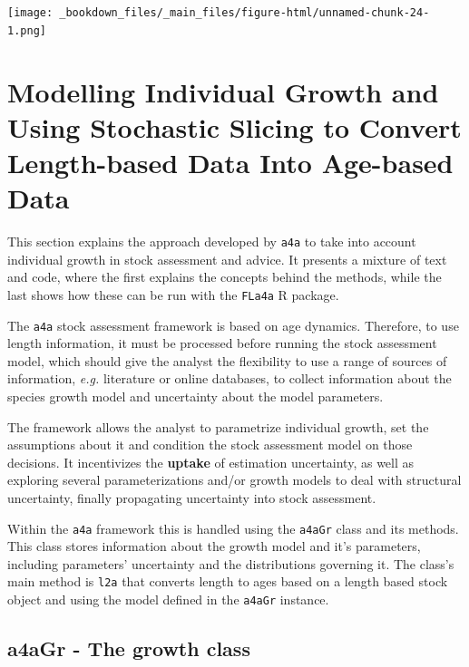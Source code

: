 \documentclass[
]{book}
\begin{document}
\texttt{[image: \_bookdown\_files/\_main\_files/figure-html/unnamed-chunk-24-1.png]}

\hypertarget{modelling-individual-growth-and-using-stochastic-slicing-to-convert-length-based-data-into-age-based-data}{%
\chapter{Modelling Individual Growth and Using Stochastic Slicing to Convert Length-based Data Into Age-based Data}\label{modelling-individual-growth-and-using-stochastic-slicing-to-convert-length-based-data-into-age-based-data}}

This section explains the approach developed by \texttt{a4a} to take into account individual growth in stock assessment and advice. It presents a mixture of text and code, where the first explains the concepts behind the methods, while the last shows how these can be run with the \texttt{FLa4a} R package.

The \texttt{a4a} stock assessment framework is based on age dynamics. Therefore, to use length information, it must be processed before running the stock assessment model, which should give the analyst the flexibility to use a range of sources of information, \emph{e.g.} literature or online databases, to collect information about the species growth model and uncertainty about the model parameters.

The framework allows the analyst to parametrize individual growth, set the assumptions about it and condition the stock assessment model on those decisions. It incentivizes the \textbf{uptake} of estimation uncertainty, as well as exploring several parameterizations and/or growth models to deal with structural uncertainty, finally propagating uncertainty into stock assessment.

Within the \texttt{a4a} framework this is handled using the \texttt{a4aGr} class and its methods. This class stores information about the growth model and it's parameters, including parameters' uncertainty and the distributions governing it. The class's main method is \texttt{l2a} that converts length to ages based on a length based stock object and using the model defined in the \texttt{a4aGr} instance.

\hypertarget{a4agr---the-growth-class}{%
\section{a4aGr - The growth class}\label{a4agr---the-growth-class}}
\end{document}
